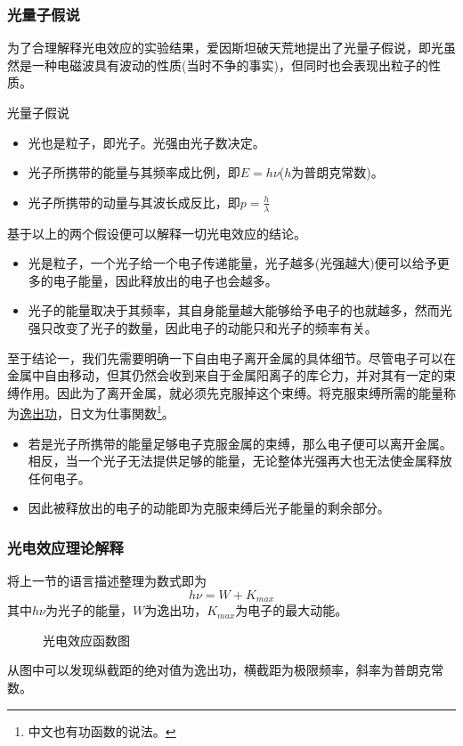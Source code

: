 \subsubsection{光量子假说}

为了合理解释光电效应的实验结果，爱因斯坦破天荒地提出了光量子假说，即光虽然是一种电磁波具有波动的性质(当时不争的事实)，但同时也会表现出粒子的性质。
\begin{itembox}[l]{光量子假说}
    \begin{itemize}
        \item 光也是粒子，即光子。光强由光子数决定。
        \item 光子所携带的能量与其频率成比例，即$E=h\nu$($h$为普朗克常数)。
        \item 光子所携带的动量与其波长成反比，即$p=\frac{h}{\lambda}$
    \end{itemize}
\end{itembox}
基于以上的两个假设便可以解释一切光电效应的结论。
\begin{itemize}
    \item 光是粒子，一个光子给一个电子传递能量，光子越多(光强越大)便可以给予更多的电子能量，因此释放出的电子也会越多。
    \item 光子的能量取决于其频率，其自身能量越大能够给予电子的也就越多，然而光强只改变了光子的数量，因此电子的动能只和光子的频率有关。
\end{itemize}
至于结论一，我们先需要明确一下自由电子离开金属的具体细节。尽管电子可以在金属中自由移动，但其仍然会收到来自于金属阳离子的库仑力，并对其有一定的束缚作用。因此为了离开金属，就必须先克服掉这个束缚。将克服束缚所需的能量称为\underline{逸出功}，日文为仕事関数\footnote{中文也有功函数的说法。}。
\begin{itemize}
    \item 若是光子所携带的能量足够电子克服金属的束缚，那么电子便可以离开金属。相反，当一个光子无法提供足够的能量，无论整体光强再大也无法使金属释放任何电子。
    \item 因此被释放出的电子的动能即为克服束缚后光子能量的剩余部分。
\end{itemize}

\subsubsection{光电效应理论解释}

将上一节的语言描述整理为数式即为
\begin{equation*}
    h\nu=W+K_{max}
\end{equation*}
其中$h\nu$为光子的能量，$W$为逸出功，$K_{max}$为电子的最大动能。
\begin{figure}[ht!]
    \centering
    \caption{光电效应函数图}
\end{figure}
从图中可以发现纵截距的绝对值为逸出功，横截距为极限频率，斜率为普朗克常数。

